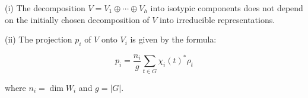 (i) The decomposition $V = V_1 \oplus \cdots \oplus V_h$ into isotypic components does not depend on the initially chosen decomposition of $V$ into irreducible representations.

(ii) The projection $p_i$ of $V$ onto $V_i$ is given by the formula:

$$p_i = \frac{n_i}{g} \sum_{t \in G} \chi_i(t)^* \rho_t$$

where $n_i = \dim W_i$ and $g = |G|$.
